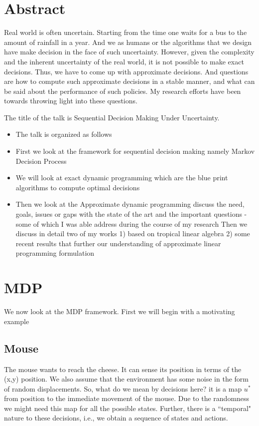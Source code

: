 \documentclass{article}
\begin{document}
\onecolumn
{}
\section{Abstract}
Real world is often uncertain. Starting from the time one waits for a bus to the amount of rainfall in a year. And we as humans or the algorithms that we design have make decision in the face of such uncertainty. However, given the complexity and the inherent uncertainty of the real world, it is not possible to make exact decisions. Thus, we have to come up with approximate decisions. And questions are how to compute such approximate decisions in a stable manner, and what can be said about the performance of such policies. My research efforts have been towards throwing light into these questions.

The title of the talk is Sequential Decision Making Under Uncertainty.
\begin{itemize}
\item The talk is organized as follows
\item First we look at the framework for sequential decision making namely Markov Decision Process
\item We will look at exact dynamic programming which are the blue print algorithms to compute optimal decisions
\item Then we look at the  Approximate dynamic programming discuss the need, goals, issues or gaps with the state of the art and the important questions -some of which I was able address during the course of my research
Then we discuss in detail two of my works
1) based on tropical linear algebra
2) some recent results that further our understanding of approximate linear programming formulation
\end{itemize}

\section{MDP}
We now look at the MDP framework. First we will begin with a motivating example
\subsection{Mouse}
The mouse wants to reach the cheese. It can sense its position in terms of the (x,y) position. We also assume that the environment has some noise in the form of random displacements.
So, what do we mean by decisions here? it is a map $u^*$ from position to the immediate movement of the mouse. Due to the randomness we might need this map for all the possible states. Further, there is a ``temporal" nature to these decisions, i.e., we obtain a sequence of states and actions.
\end{document}

